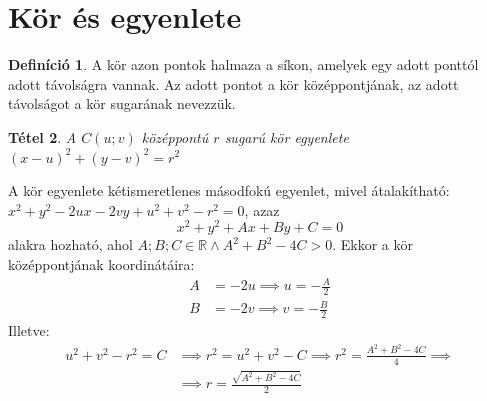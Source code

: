 \documentclass[twoside,12pt]{report}
\newtheorem{theorem}{Tétel}[section]
\theoremstyle{definition}
\newtheorem{definition}[theorem]{Definíció}
\begin{document}
\section{Kör és egyenlete}
	\begin{definition}
		A kör azon pontok halmaza a síkon, amelyek egy adott ponttól adott távolságra vannak.
		Az adott pontot a kör középpontjának, az adott távolságot a kör sugarának nevezzük.
	\end{definition}
	\begin{theorem}
		A $C(u;v)$ középpontú $r$ sugarú kör egyenlete $(x-u)^2+(y-v)^2=r^2$
	\end{theorem}
	A kör egyenlete kétismeretlenes másodfokú egyenlet, mivel átalakítható: $x^2+y^2-2ux-2vy+u^2+v^2-r^2=0$, azaz
	\begin{equation*}
		x^2+y^2+Ax+By+C=0
	\end{equation*}
	alakra hozható, ahol $A;B;C\in\mathbb{R}\wedge A^2+B^2-4C>0$. Ekkor a kör középpontjának koordinátáira:
	\begin{align*}
		A&=-2u\implies u=-\frac{A}{2}\\
		B&=-2v\implies v=-\frac{B}{2}
	\end{align*}
	Illetve:
	\begin{align*}
		u^2+v^2-r^2=C&\implies r^2=u^2+v^2-C\implies r^2=\frac{A^2+B^2-4C}{4}\implies \\&\implies r=\frac{\sqrt{A^2+B^2-4C}}{2}
	\end{align*}
\end{document}
